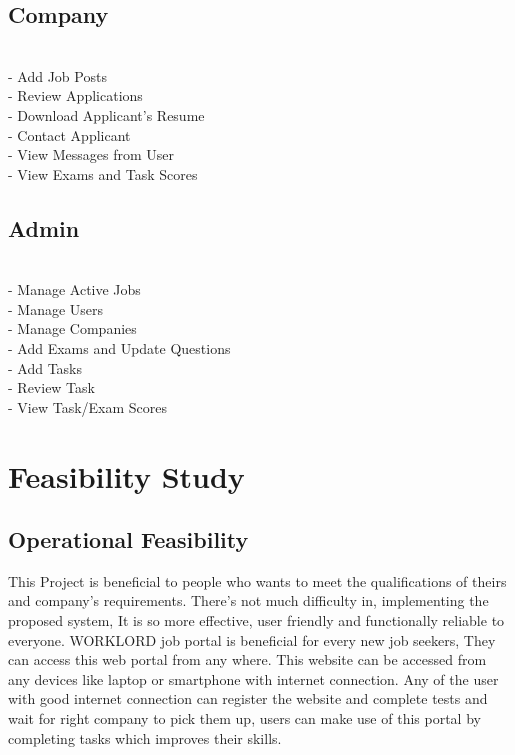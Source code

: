 \documentclass[a4paper,12pt]{report}
\begin{document}
\subsection{Company}

\subitem
\\ - Add Job Posts
\\ - Review Applications
\\ - Download Applicant's Resume
\\ - Contact Applicant
\\ - View Messages from User
\\ - View Exams and Task Scores

\subsection{Admin}

\subitem
\\ - Manage Active Jobs
\\ - Manage Users
\\ - Manage Companies
\\ - Add Exams and Update Questions
\\ - Add Tasks
\\ - Review Task
\\ - View Task/Exam Scores

\pagebreak


\section{Feasibility Study}

\subsection{Operational Feasibility}

\hspace*{12pt} This Project is beneficial to people who wants to meet the qualifications of theirs and 
company's requirements. There's not much difficulty in, implementing the proposed system, It is so more effective, user friendly and functionally reliable to everyone. WORKLORD job portal is beneficial for every new job seekers, They can access this web portal from any where. This
website can be accessed from any devices like laptop or smartphone with internet connection. Any
of the user with good internet connection can register the website and complete tests and wait for right company to pick them up, users can make use of this portal by completing tasks which improves their skills.
\end{document}
